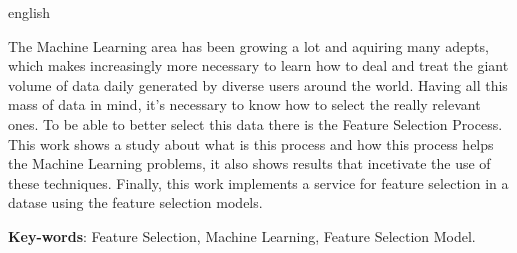 \begin{resumo}[Abstract]
 \begin{otherlanguage*}{english}

 The Machine Learning area has been growing a lot and aquiring many adepts, which makes increasingly more necessary to learn how to deal and treat the giant volume of data daily generated by diverse users around the world. Having all this mass of data in mind, it's necessary to know how to select the really relevant ones. To be able to better select this data there is the Feature Selection Process. This work shows a study about what is this process and how this process helps the Machine Learning problems, it also shows results that incetivate the use of these techniques. Finally, this work implements a service for feature selection in a datase using the feature selection models.

   \vspace{\onelineskip}
 
   \noindent 
   \textbf{Key-words}: Feature Selection, Machine Learning, Feature Selection Model.
 \end{otherlanguage*}
\end{resumo}
